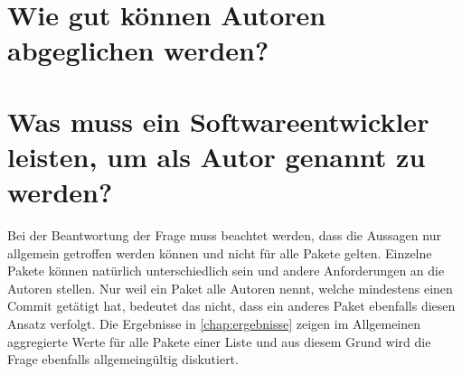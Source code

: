 \section{Wie gut können Autoren abgeglichen werden?}
\label{sec:abgleich_diskussion}

\section{Was muss ein Softwareentwickler leisten, um als Autor genannt zu werden?}
\label{sec:zitationsfaehiger_autor_diskussion}
Bei der Beantwortung der Frage muss beachtet werden, dass die Aussagen nur allgemein getroffen werden können und nicht für alle Pakete gelten.
Einzelne Pakete können natürlich unterschiedlich sein und andere Anforderungen an die Autoren stellen.
Nur weil ein Paket alle Autoren nennt, welche mindestens einen Commit getätigt hat, bedeutet das nicht, dass ein anderes Paket ebenfalls diesen Ansatz verfolgt.
Die Ergebnisse in \autoref{chap:ergebnisse} zeigen im Allgemeinen aggregierte Werte für alle Pakete einer Liste und aus diesem Grund wird die Frage ebenfalls allgemeingültig diskutiert.

